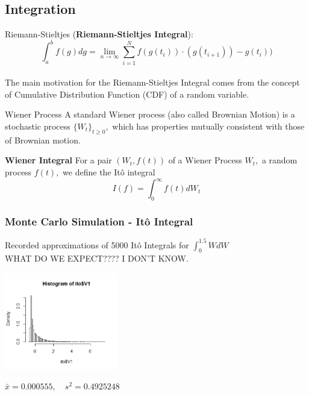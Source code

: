 \subsection{Integration}
\begin{frame}{Riemann-Stieltjes}
(\textbf{Riemann-Stieltjes Integral}): 
$$\displaystyle \int_{a}^{b} f(g)dg= \underset{n \to \infty}{\lim} \sum_{i=1}^{N} f(g(t_i)) \cdot (g(t_{i+1}))- g(t_i))$$\\

The main motivation for the Riemann-Stieltjes Integral comes from the concept of Cumulative Distribution Function (CDF) of a random variable. 
\end{frame}

\begin{frame}{Wiener Process}
A standard Wiener process (also called Brownian Motion) is a stochastic process $\{W_t\}_{t \geq 0},$ which has properties mutually consistent with those of Brownian motion.

\vfill

\textbf{Wiener Integral} For a pair $(W_t,f(t))$ of a Wiener Process $W_t,$ a random process $f(t),$ we define the It\^o integral 
	$$I(f)=\int_0^{\infty} f(t)dW_t$$
\end{frame}

\begin{frame}
   \frametitle{Monte Carlo Simulation - It\^o Integral}
	Recorded approximations of 5000 It\^o Integrals for $\int^{1.5}_{0} W dW$\\
	WHAT DO WE EXPECT???? I DON'T KNOW. \\
	\begin{center}
		\includegraphics[width=5cm]{img/ito}\\
	\end{center}
	\begin{center}
	$\bar{x}=0.000555,\hspace{1em} s^{2}=0.4925248$%

	\end{center} 
\end{frame}


